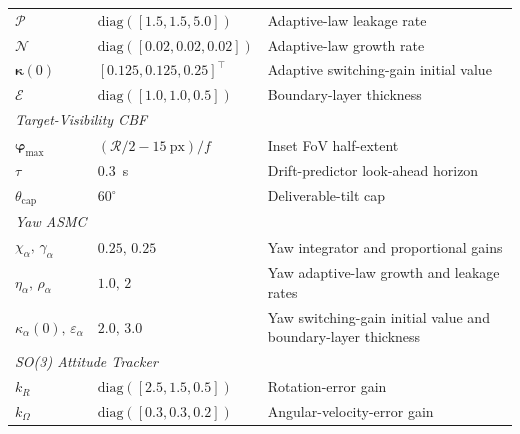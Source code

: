 \documentclass{IEEEtaes}
\begin{document}
\begin{table}[!t]
\begin{tabular}{p{} p{} p{}}
        $\mathcal{P}$           & $\text{diag}([1.5,1.5,5.0])$ & Adaptive-law leakage rate \\
        $\mathcal{N}$           & $\text{diag}([0.02,0.02,0.02])$ & Adaptive-law growth rate \\
        $\boldsymbol{\kappa}(0)$ & $[0.125,0.125,0.25]^\top$ & Adaptive switching-gain initial value \\
        $\mathcal{E}$           & $\text{diag}([1.0,1.0,0.5])$ & Boundary-layer thickness \\
    \midrule
        \multicolumn{3}{l}{\textit{Target-Visibility CBF}} \\
        $\boldsymbol{\varphi}_\text{max}$ & $(\mathcal{R}/2-15~\text{px})/f$ & Inset FoV half-extent \\
        $\tau$                      & $0.3$~s & Drift-predictor look-ahead horizon \\
        $\theta_\text{cap}$         & $60^\circ$ & Deliverable-tilt cap \\
    \midrule
        \multicolumn{3}{l}{\textit{Yaw ASMC}} \\
        $\chi_\alpha,\,\gamma_\alpha$       & $0.25,\,0.25$ & Yaw integrator and proportional gains \\
        $\eta_\alpha,\,\rho_\alpha$         & $1.0,\,2$ & Yaw adaptive-law growth and leakage rates \\
        $\kappa_{\alpha}(0),\,\varepsilon_\alpha$ & $2.0,\,3.0$ & Yaw switching-gain initial value and boundary-layer thickness \\
    \midrule
        \multicolumn{3}{l}{\textit{SO(3) Attitude Tracker}} \\
        $k_R$      & $\text{diag}([2.5,1.5,0.5])$ & Rotation-error gain \\
        $k_\Omega$ & $\text{diag}([0.3,0.3,0.2])$ & Angular-velocity-error gain \\
    \bottomrule
    \end{tabular}
\end{table}
\end{document}
